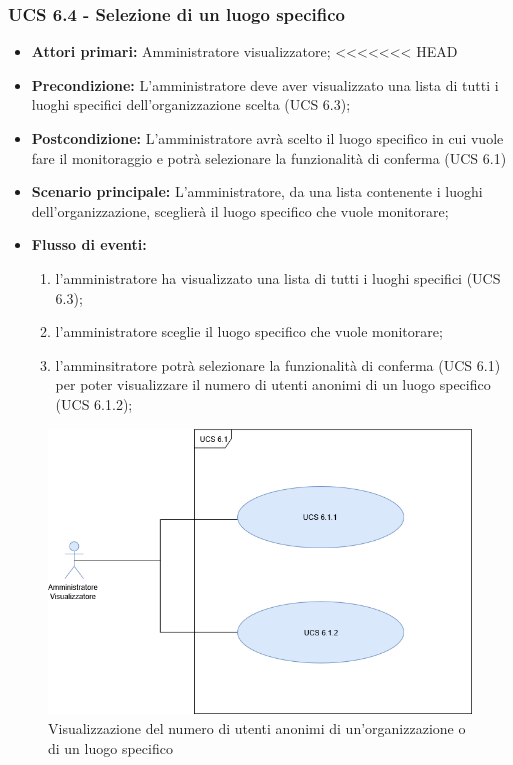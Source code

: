 \subsubsection{UCS 6.4 - Selezione di un luogo specifico}
\begin{itemize}
	\item \textbf{Attori primari:} Amministratore visualizzatore;
<<<<<<< HEAD
	\item \textbf{Precondizione:} L'amministratore deve aver visualizzato una lista di tutti i luoghi specifici dell'organizzazione scelta (UCS 6.3);
	\item \textbf{Postcondizione:} L'amministratore avrà scelto il luogo specifico in cui vuole fare il monitoraggio e potrà selezionare la funzionalità di conferma (UCS 6.1)
	\item \textbf{Scenario principale:} L'amministratore, da una lista contenente i luoghi dell'organizzazione, sceglierà il luogo specifico che vuole monitorare;
	\item \textbf{Flusso di eventi:} 
	\begin{enumerate}
		\item l'amministratore ha visualizzato una lista di tutti i luoghi specifici (UCS 6.3);
		\item l'amministratore sceglie il luogo specifico che vuole monitorare;
		\item l'amminsitratore potrà selezionare la funzionalità di conferma (UCS 6.1) per poter visualizzare il numero di utenti anonimi di un luogo specifico (UCS 6.1.2);
	\end{enumerate}
\end{itemize}


\begin{figure}[h]
	\centering
	\includegraphics[scale=0.3]{sezioni/UseCase/Immagini/UCS6_1.png}
	\caption{Visualizzazione del numero di utenti anonimi di un'organizzazione o di un luogo specifico}
\end{figure}


